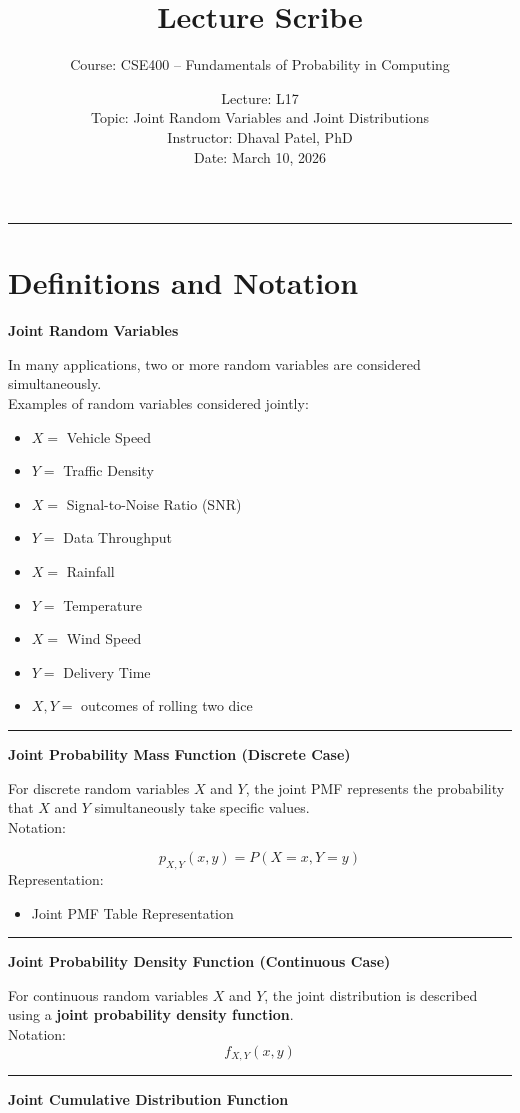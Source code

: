 \documentclass[12pt]{article}
\title{Lecture Scribe}
\author{Course: CSE400 – Fundamentals of Probability in Computing}
\date{Lecture: L17 \\ Topic: Joint Random Variables and Joint Distributions \\ Instructor: Dhaval Patel, PhD \\ Date: March 10, 2026}
\begin{document}
\maketitle
\noindent\rule{\linewidth}{0.4pt}
\section{Definitions and Notation}

\textbf{Joint Random Variables}

In many applications, two or more random variables are considered simultaneously.\\
Examples of random variables considered jointly:

\begin{itemize}
\item $X =$ Vehicle Speed
\item $Y =$ Traffic Density
\item $X =$ Signal-to-Noise Ratio (SNR)
\item $Y =$ Data Throughput
\item $X =$ Rainfall
\item $Y =$ Temperature
\item $X =$ Wind Speed
\item $Y =$ Delivery Time
\item $X, Y =$ outcomes of rolling two dice
\end{itemize}
\noindent\rule{\linewidth}{0.4pt}
\textbf{Joint Probability Mass Function (Discrete Case)}

For discrete random variables $X$ and $Y$, the joint PMF represents the probability that $X$ and $Y$ simultaneously take specific values.\\
{Notation:}

\[
p_{X,Y}(x,y) = P(X = x, Y = y)
\]
\newpage
{Representation:}

\begin{itemize}
\item Joint PMF Table Representation
\end{itemize}
\noindent\rule{\linewidth}{0.4pt}

\textbf{Joint Probability Density Function (Continuous Case)}

For continuous random variables $X$ and $Y$, the joint distribution is described using a \textbf{joint probability density function}.\\
Notation:
\[
f_{X,Y}(x,y)
\]
\noindent\rule{\linewidth}{0.4pt}
\textbf{Joint Cumulative Distribution Function}
\end{document}
